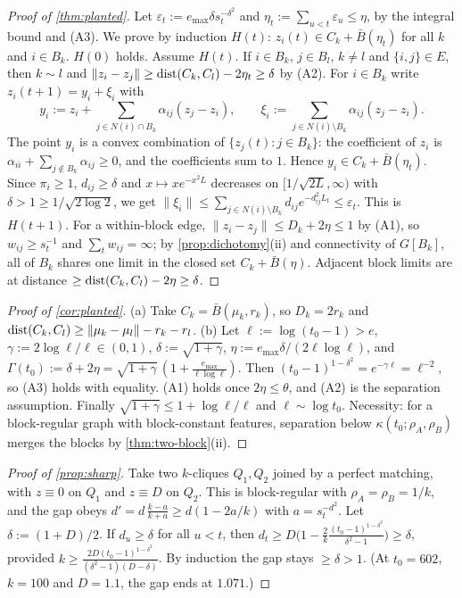 \begin{proof}[Proof of \cref{thm:planted}]
Let $\varepsilon_t:=e_{\max}\delta s_t^{-\delta^2}$ and $\eta_t:=\sum_{u<t}\varepsilon_u\le\eta$, by the integral bound and (A3). We prove by induction
$H(t)$: $z_i(t)\in C_k+\bar B(\eta_t)$ for all $k$ and $i\in B_k$. $H(0)$ holds. Assume $H(t)$. If $i\in B_k$, $j\in B_l$, $k\ne l$ and
$\{i,j\}\in E$, then $k\sim l$ and $\|z_i-z_j\|\ge\operatorname{dist}(C_k,C_l)-2\eta_t\ge\delta$ by (A2). For $i\in B_k$ write $z_i(t+1)=y_i+\xi_i$ with
\[
y_i:=z_i+\sum_{j\in N(i)\cap B_k}\alpha_{ij}(z_j-z_i),\qquad \xi_i:=\sum_{j\in N(i)\setminus B_k}\alpha_{ij}(z_j-z_i).
\]
The point $y_i$ is a convex combination of $\{z_j(t):j\in B_k\}$: the coefficient of $z_i$ is $\alpha_{ii}+\sum_{j\notin B_k}\alpha_{ij}\ge0$,
and the coefficients sum to $1$. Hence $y_i\in C_k+\bar B(\eta_t)$. Since $\pi_i\ge1$, $d_{ij}\ge\delta$ and $x\mapsto xe^{-x^2L}$ decreases on
$[1/\sqrt{2L},\infty)$ with $\delta>1\ge1/\sqrt{2\log2}$, we get $\|\xi_i\|\le\sum_{j\in N(i)\setminus B_k}d_{ij}e^{-d_{ij}^2L_t}\le\varepsilon_t$. This is
$H(t+1)$. For a within-block edge, $\|z_i-z_j\|\le D_k+2\eta\le1$ by (A1), so $w_{ij}\ge s_t^{-1}$ and $\sum_tw_{ij}=\infty$; by
\cref{prop:dichotomy}(ii) and connectivity of $G[B_k]$, all of $B_k$ shares one limit in the closed set $C_k+\bar B(\eta)$. Adjacent block
limits are at distance $\ge\operatorname{dist}(C_k,C_l)-2\eta\ge\delta$.
\end{proof}

\begin{proof}[Proof of \cref{cor:planted}]
(a) Take $C_k=\bar B(\mu_k,r_k)$, so $D_k=2r_k$ and $\operatorname{dist}(C_k,C_l)\ge\|\mu_k-\mu_l\|-r_k-r_l$.
(b) Let $\ell:=\log(t_0-1)>e$, $\gamma:=2\log\ell/\ell\in(0,1)$, $\delta:=\sqrt{1+\gamma}$, $\eta:=e_{\max}\delta/(2\ell\log\ell)$, and
$\Gamma(t_0):=\delta+2\eta=\sqrt{1+\gamma}\,(1+\frac{e_{\max}}{\ell\log\ell})$. Then $(t_0-1)^{1-\delta^2}=e^{-\gamma\ell}=\ell^{-2}$, so (A3) holds
with equality. (A1) holds once $2\eta\le\theta$, and (A2) is the separation assumption. Finally $\sqrt{1+\gamma}\le1+\log\ell/\ell$ and
$\ell\sim\log t_0$. Necessity: for a block-regular graph with block-constant features, separation below $\kappa(t_0;\rho_A,\rho_B)$ merges the
blocks by \cref{thm:two-block}(ii).
\end{proof}

\begin{proof}[Proof of \cref{prop:sharp}]
Take two $k$-cliques $Q_1,Q_2$ joined by a perfect matching, with $z\equiv0$ on $Q_1$ and $z\equiv D$ on $Q_2$. This is block-regular with
$\rho_A=\rho_B=1/k$, and the gap obeys $d'=d\,\frac{k-a}{k+a}\ge d(1-2a/k)$ with $a=s_t^{-d^2}$. Let $\delta:=(1+D)/2$. If $d_u\ge\delta$ for all
$u<t$, then $d_t\ge D\big(1-\frac2k\frac{(t_0-1)^{1-\delta^2}}{\delta^2-1}\big)\ge\delta$, provided
$k\ge\frac{2D(t_0-1)^{1-\delta^2}}{(\delta^2-1)(D-\delta)}$. By induction the gap stays $\ge\delta>1$. (At $t_0=602$, $k=100$ and $D=1.1$, the gap ends at
$1.071$.)
\end{proof}

